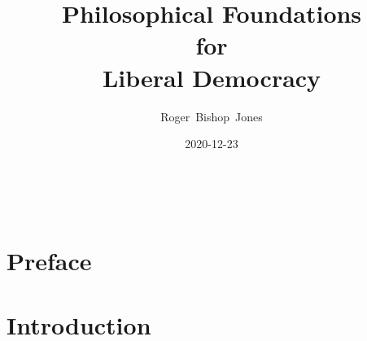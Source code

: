 \documentclass[10pt,titlepage]{article}
\title{\bf\LARGE Philosophical Foundations\\ for\\ Liberal Democracy}
\author{Roger~Bishop~Jones}
\date{\small 2020-12-23}
\newcommand{\ignore}[1]{}
\begin{document}
%
% 
                               
\begin{titlepage}
\maketitle





\end{titlepage}

\ \

\ignore{
\begin{centering}
{}
\end{centering}
}%

\setcounter{tocdepth}{2}
{\parskip-0pt\tableofcontents}


\pagebreak

\section*{Preface}



\section{Introduction}
\end{document}

